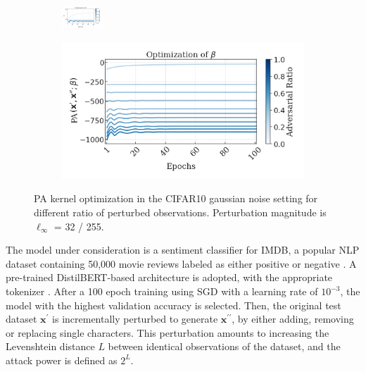 \begin{figure}[t]
    \centering
    \begin{subfigure}[b]{0.49\textwidth}
        \centering
        \includegraphics[width=\textwidth]{img/results_discussion/empirical/beta_100.pdf}
    \end{subfigure}
    \hfill
    \begin{subfigure}[b]{0.49\textwidth}
        \centering
        \includegraphics[width=\textwidth]{img/results_discussion/empirical/logPA_100.png}
    \end{subfigure}
    \caption{PA kernel optimization in the CIFAR10 gaussian noise setting for different ratio
    of perturbed observations. Perturbation magnitude is $\ell_\infty$ = 32 / 255.}
    \label{fig:gaussian_optimization}
\end{figure}



\begin{experiment}
The model under consideration is a sentiment classifier for IMDB,
a popular NLP dataset containing 50,000 movie reviews labeled 
as either positive or negative
\cite{maas2011learning}. 
A pre-trained DistilBERT-based architecture 
is adopted, with the appropriate tokenizer
\cite{sanh2019distilbert}. 
After a 100 epoch training using SGD with a learning rate of $10^{-3}$, the model with the highest validation
accuracy is selected. Then, the original test dataset $\bm{x}^\prime$
is incrementally perturbed to generate $\bm{x}^{\prime \prime}$, by either adding, removing or replacing 
single characters. This perturbation amounts to increasing the Levenshtein
distance $L$ between identical observations of the dataset, and the attack power
is defined as $2^{L}$.
\end{experiment}

